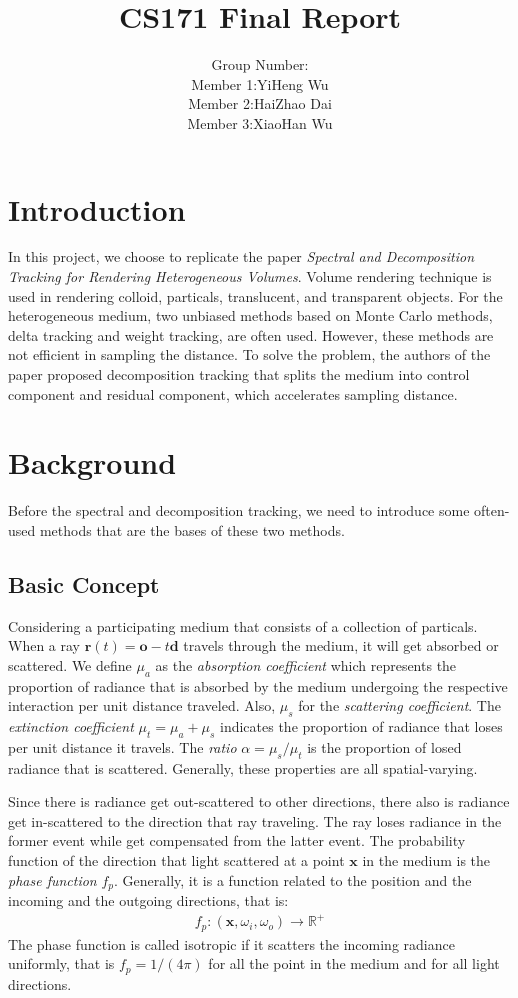 \documentclass[acmtog]{acmart}
\title{CS171 Final Report}
\author{
	Group Number:\quad 1 \\
	Member 1:\quad YiHeng Wu\\
	Member 2:\quad HaiZhao Dai\\
	Member 3:\quad XiaoHan Wu
}
\begin{document}
\maketitle

\vspace*{2 ex}

\section{Introduction}
In this project, we choose to replicate the paper \textit{Spectral and Decomposition Tracking for Rendering Heterogeneous Volumes}.
Volume rendering technique is used in rendering colloid, particals, translucent, and transparent objects. 
For the heterogeneous medium, two unbiased methods based on Monte Carlo methods, delta tracking and weight tracking, are often used.
However, these methods are not efficient in sampling the distance. 
To solve the problem, the authors of the paper proposed decomposition tracking that splits the medium into control component and residual component, which accelerates sampling distance.
\section{Background}
Before the spectral and decomposition tracking, we need to introduce some often-used methods that are the bases of these two methods.

\subsection{Basic Concept}
Considering a participating medium that consists of a collection of particals.
When a ray $\mathbf r(t)=\mathbf o-t\mathbf d$ travels through the medium, it will get absorbed or scattered.
We define $\mu_a$ as the \textit{absorption coefficient} which represents the proportion of radiance that is absorbed by the medium undergoing the respective interaction per unit distance traveled.
Also, $\mu_s$ for the \textit{scattering coefficient}.
The \textit{extinction coefficient} $\mu_t=\mu_a+\mu_s$ indicates the proportion of radiance that loses per unit distance it travels. 
The \textit{ratio} $\alpha=\mu_s/\mu_t$ is the proportion of losed radiance that is scattered.
Generally, these properties are all spatial-varying.

Since there is radiance get out-scattered to other directions, there also is radiance get in-scattered to the direction that ray traveling.
The ray loses radiance in the former event while get compensated from the latter event.
The probability function of the direction that light scattered at a point $\mathbf x$ in the medium is the \textit{phase function} $f_p$.
Generally, it is a function related to the position and the incoming and the outgoing directions, that is:
\begin{equation}
	\begin{aligned}
	f_p:(\mathbf x, \omega_i, \omega_o)\to\mathbb R^+
	\end{aligned}
\end{equation}
The phase function is called isotropic if it scatters the incoming radiance uniformly, that is $f_p=1/(4\pi)$ for all the point in the medium and for all light directions.
\end{document}
